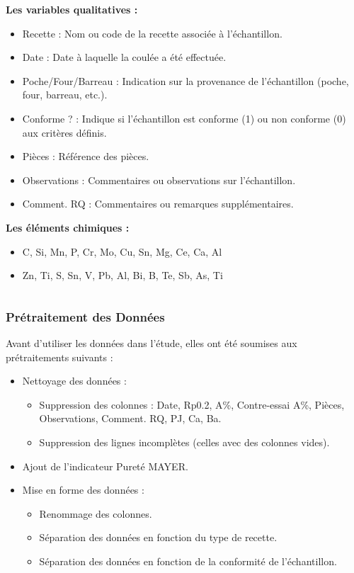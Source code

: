 \documentclass[aspectratio=169]{beamer}
\begin{document}
\begin{frame}
\begin{columns}[t]
  \begin{column}{0.5\textwidth}
      \textbf{Les variables qualitatives :}
      \tiny
      \begin{itemize}
        \item Recette : Nom ou code de la recette associée à l'échantillon.
        \item Date : Date à laquelle la coulée a été effectuée.
        \item Poche/Four/Barreau : Indication sur la provenance de l'échantillon (poche, four, barreau, etc.).
        \item Conforme ? : Indique si l'échantillon est conforme (1) ou non conforme (0) aux critères définis.
        \item Pièces : Référence des pièces.
        \item Observations : Commentaires ou observations sur l'échantillon.
        \item Comment. RQ : Commentaires ou remarques supplémentaires.
      \end{itemize}
      \vspace{10pt}
      \normalsize
      \textbf{Les éléments chimiques :}
      \tiny
      \begin{itemize}
        \item C, Si, Mn, P, Cr, Mo, Cu, Sn, Mg, Ce, Ca, Al 
        \item Zn, Ti, S, Sn, V, Pb, Al, Bi, B, Te, Sb, As, Ti 
      \end{itemize}
  \end{column}

\end{columns}
\end{frame}

\begin{frame}
\frametitle{Prétraitement des Données}

Avant d'utiliser les données dans l'étude, elles ont été soumises aux prétraitements suivants :

\begin{itemize}
\item Nettoyage des données :
\begin{itemize}
\item Suppression des colonnes : Date, Rp0.2, A\%, Contre-essai A\%, Pièces, Observations, Comment. RQ, PJ, Ca, Ba.
\item Suppression des lignes incomplètes (celles avec des colonnes vides).
\end{itemize}
\item Ajout de l'indicateur Pureté MAYER.
\item Mise en forme des données :
\begin{itemize}
\item Renommage des colonnes.
\item Séparation des données en fonction  du type de recette.
\item Séparation des données en fonction de la conformité de l'échantillon.
\end{itemize}
\end{itemize}

\end{frame}
\end{document}
